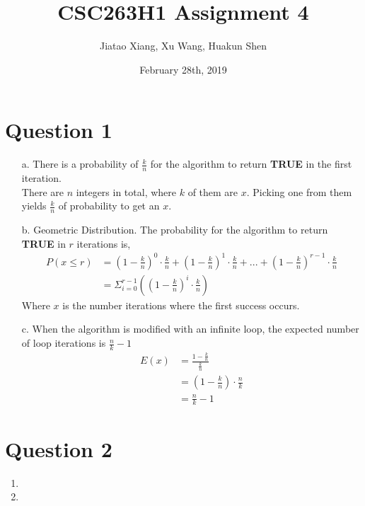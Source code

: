 \documentclass[10pt]{article}
\title{CSC263H1 Assignment 4}
\author{Jiatao Xiang, Xu Wang, Huakun Shen}
\date{February 28th, 2019}
\begin{document}
\maketitle
\section*{Question 1}
\begin{enumerate}
\item[a.] There is a probability of $\frac{k}{n}$ for the algorithm to return \textbf{TRUE} in the first iteration.\\
There are $n$ integers in total, where $k$ of them are $x$. Picking one from them yields $\frac{k}{n}$ of probability to get an $x$.

\item[b.] Geometric Distribution. The probability for the algorithm to return \textbf{TRUE} in $r$ iterations is,
\begin{align*}
P(x\leq r)&=(1-\frac{k}{n})^0\cdot \frac{k}{n}+(1-\frac{k}{n})^1\cdot \frac{k}{n}+...+(1-\frac{k}{n})^{r-1}\cdot \frac{k}{n}\\
&=\Sigma^{r-1}_{i=0}((1-\frac{k}{n})^i\cdot \frac{k}{n})
\end{align*}
Where $x$ is the number iterations where the first success occurs.
\item[c.] When the algorithm is modified with an infinite loop, the expected number of loop iterations is $\frac{n}{k}-1$
\begin{align*}
E(x)&=\frac{1-\frac{k}{n}}{\frac{k}{n}}\\
&=(1-\frac{k}{n})\cdot\frac{n}{k}\\
&=\frac{n}{k}-1
\end{align*}
\end{enumerate}

\section*{Question 2}
\begin{enumerate}
\item
\item
\end{enumerate}
\end{document}
